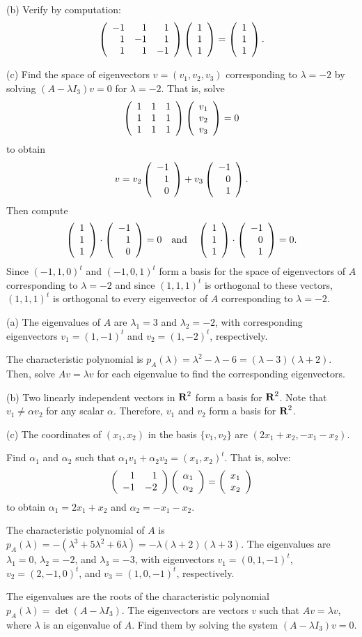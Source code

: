 (b) Verify by computation:
\[
\left(\begin{array}{rrr} -1 & 1 & 1 \\ 1 & -1 & 1 \\ 1 & 1 & -1\end{array}\right)\left(\begin{array}{r} 1 \\ 1 \\ 1\end{array}\right) =
\left(\begin{array}{r} 1 \\ 1 \\ 1\end{array}\right).
\]

(c) Find the space of eigenvectors $v = (v_1,v_2,v_3)$ corresponding
to $\lambda = -2$ by solving $(A - \lambda I_3)v = 0$ for $\lambda = -2$.
That is, solve
\[
\left(\begin{array}{rrr} 1 & 1 & 1 \\ 1 & 1 & 1 \\ 1 & 1 & 1\end{array}\right)\left(\begin{array}{r} v_1 \\ v_2 \\ v_3\end{array}\right) = 0
\]
to obtain
\[
v = v_2\left(\begin{array}{r} -1 \\ 1 \\ 0\end{array}\right) + v_3\left(\begin{array}{r} -1 \\ 0 \\ 1\end{array}\right).
\]
Then compute
\[
\left(\begin{array}{r} 1 \\ 1 \\ 1\end{array}\right) \cdot \left(\begin{array}{r} -1 \\ 1 \\ 0\end{array}\right) = 0 \quad\mbox{and}\quad
\left(\begin{array}{r} 1 \\ 1 \\ 1\end{array}\right) \cdot \left(\begin{array}{r} -1 \\ 0 \\ 1\end{array}\right) = 0.
\]
Since $(-1,1,0)^t$ and $(-1,0,1)^t$ form a basis for the space of
eigenvectors of $A$ corresponding to $\lambda = -2$ and since
$(1,1,1)^t$ is orthogonal to these vectors, $(1,1,1)^t$ is
orthogonal to every eigenvector of $A$ corresponding to
$\lambda = -2$.

(a) \ans The eigenvalues of $A$ are $\lambda_1 = 3$ and $\lambda_2 = -2$,
with corresponding eigenvectors $v_1 = (1,-1)^t$ and
$v_2 = (1,-2)^t$, respectively.

\soln The characteristic polynomial is $p_A(\lambda) =
\lambda^2 - \lambda - 6 = (\lambda - 3)(\lambda + 2)$.  Then, solve
$Av = \lambda v$ for each eigenvalue to find the corresponding eigenvectors.

(b) Two linearly independent vectors in $\mbox{$\bf{R}$}^2$ form a basis for $\mbox{$\bf{R}$}^2$.
Note that $v_1 \neq \alpha v_2$ for any scalar $\alpha$.  Therefore,
$v_1$ and $v_2$ form a basis for $\mbox{$\bf{R}$}^2$.

(c) \ans The coordinates of $(x_1,x_2)$ in the basis $\{v_1,v_2\}$ are
$(2x_1 + x_2, -x_1 - x_2)$. 

\soln Find $\alpha_1$ and $\alpha_2$ such that $\alpha_1v_1 +
\alpha_2v_2 = (x_1,x_2)^t$.  That is, solve:
\[
\left(\begin{array}{rr} 1 & 1\\ -1 &-2\end{array}\right)\left(\begin{array}{r} \alpha_1 \\ \alpha_2\end{array}\right) = \left(\begin{array}{r} x_1 \\ x_2\end{array}\right)
\]
to obtain $\alpha_1 = 2x_1 + x_2$ and $\alpha_2 = -x_1 - x_2$.

\ans The characteristic polynomial of $A$ is $p_A(\lambda) = -(\lambda^3
+ 5\lambda^2 + 6\lambda) = -\lambda(\lambda + 2)(\lambda + 3)$. 
The eigenvalues are $\lambda_1 = 0$, $\lambda_2 = -2$, and $\lambda_3 = -3$,
with eigenvectors $v_1 = (0,1,-1)^t$, $v_2 = (2,-1,0)^t$, and 
$v_3 = (1,0,-1)^t$, respectively.

\soln The eigenvalues are the roots of the characteristic polynomial
$p_A(\lambda) = \det(A - \lambda I_3)$.  The eigenvectors are vectors
$v$ such that $Av = \lambda v$, where $\lambda$ is an eigenvalue of
$A$.  Find them by solving the system $(A - \lambda I_3)v = 0$.

